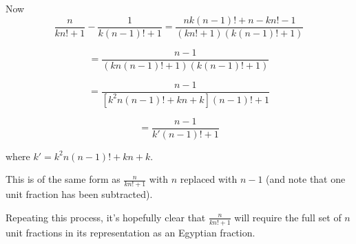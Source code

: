 \documentclass[a4paper,10pt]{article}
\begin{document}
\begin{flushleft}
Now
\begin{equation*} 
\frac{n}{kn!+1} - \frac{1}{k(n-1)!+1} = \frac{nk(n-1)! + n - kn! - 1}{(kn!+1)(k(n-1)!+1)}
\end{equation*} 

\begin{equation*} 
 = \frac{n - 1}{(kn(n-1)!+1)(k(n-1)!+1)}
\end{equation*}

\begin{equation*} 
 = \frac{n - 1}{[k^2n(n-1)! + kn + k](n-1)! + 1}
\end{equation*}

\begin{equation*} 
 = \frac{n - 1}{k'(n-1)! + 1}
\end{equation*}

where $k' = k^2n(n-1)! + kn + k$.

This is of the same form as $\frac{n}{kn!+1}$ with $n$ replaced with $n-1$ (and note that one unit fraction has been subtracted).

Repeating this process, it's hopefully clear that $\frac{n}{kn!+1}$ will require the full set of $n$ unit fractions in its representation as an Egyptian fraction.

\end{flushleft}
\end{document}
